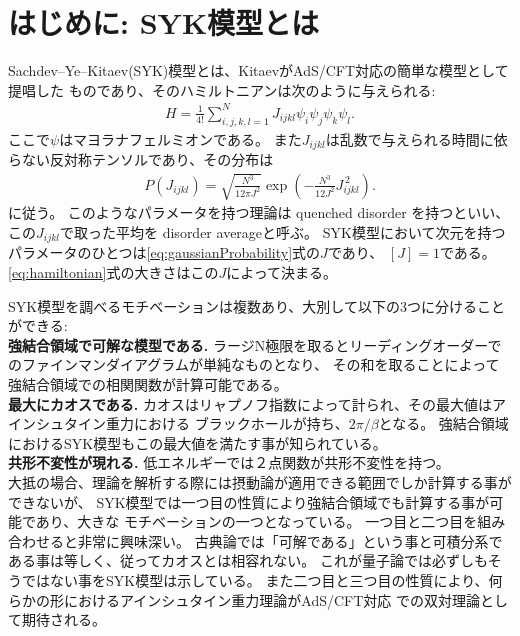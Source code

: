 \section{はじめに: SYK模型とは}
Sachdev--Ye--Kitaev(SYK)模型とは、KitaevがAdS/CFT対応の簡単な模型として提唱した
ものであり、そのハミルトニアンは次のように与えられる:
\begin{align}
  H = \frac{1}{4!}\sum_{i,j,k,l = 1}^{N} J_{ijkl}\psi_i\psi_j\psi_k\psi_l.
  \label{eq:hamiltonian}
\end{align}
ここで$\psi$はマヨラナフェルミオンである。
また$J_{ijkl}$は乱数で与えられる時間に依らない反対称テンソルであり、その分布は
\begin{align}
  P(J_{ijkl}) = \sqrt{\frac{N^3}{12\pi J^2}}
                \exp\left(-\frac{N^3}{12J^2}J_{ijkl}^{\, 2}\right).
	\label{eq:gaussianProbability}
\end{align}
に従う。
このようなパラメータを持つ理論は quenched disorder を持つといい、
この$J_{ijkl}$で取った平均を disorder averageと呼ぶ。
SYK模型において次元を持つパラメータのひとつは\eqref{eq:gaussianProbability}式の$J$であり、
$[J] = 1$である。\eqref{eq:hamiltonian}式の大きさはこの$J$によって決まる。

SYK模型を調べるモチベーションは複数あり、大別して以下の3つに分けることができる:\\

\textbf{強結合領域で可解な模型である.}
ラージN極限を取るとリーディングオーダーでのファインマンダイアグラムが単純なものとなり、
その和を取ることによって強結合領域での相関関数が計算可能である。\\

\textbf{最大にカオスである.}
カオスはリャプノフ指数によって計られ、その最大値はアインシュタイン重力における
ブラックホールが持ち、$2\pi / \beta$となる\cite{shenker}。
強結合領域におけるSYK模型もこの最大値を満たす事が知られている\cite{maldacena}。\\

\textbf{共形不変性が現れる.}
低エネルギーでは２点関数が共形不変性を持つ。\\

大抵の場合、理論を解析する際には摂動論が適用できる範囲でしか計算する事ができないが、
SYK模型では一つ目の性質により強結合領域でも計算する事が可能であり、大きな
モチベーションの一つとなっている。
一つ目と二つ目を組み合わせると非常に興味深い。
古典論では「可解である」という事と可積分系である事は等しく、従ってカオスとは相容れない\cite{polchinski}。
これが量子論では必ずしもそうではない事をSYK模型は示している。
また二つ目と三つ目の性質により、何らかの形におけるアインシュタイン重力理論がAdS/CFT対応
での双対理論として期待される。

